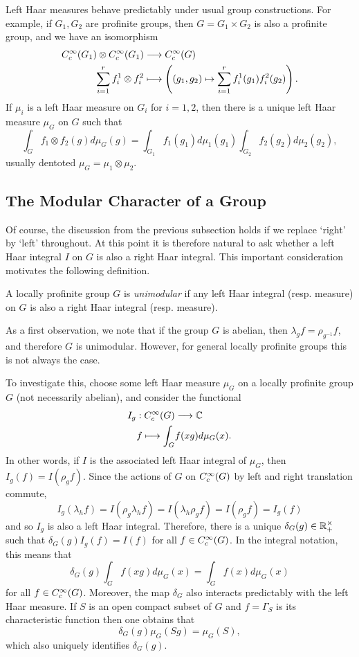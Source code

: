 Left Haar measures behave predictably under usual group constructions. For example, if $G_1,G_2$ are profinite groups, then $G=G_1\times G_2$ is also a profinite group, and we have an isomorphism 
\begin{align*}
    C_c^{\infty}(G_1)\otimes C_c^{\infty}(G_1)&\longrightarrow C_c^{\infty}(G)\\
    \sum_{i=1}^{r}f_i^1\otimes f_i^2 &\longmapsto \left((g_1,g_2)\mapsto \sum_{i=1}^{r}f_i^1(g_1)f_i^2(g_2)\right).
\end{align*}
If $\mu_i$ is a left Haar measure on $G_i$ for $i=1,2$, then there is a unique left Haar measure $\mu_G$ on $G$ such that 
$$\int_G f_1\otimes f_2(g)d\mu_G(g)=\int_{G_1}f_1(g_1)d\mu_1(g_1)\int_{G_2}f_2(g_2)d\mu_2(g_2),$$
usually dentoted $\mu_G=\mu_1\otimes\mu_2$.

\subsection{The Modular Character of a Group}

Of course, the discussion from the previous subsection holds if we replace `right' by `left' throughout. At this point it is therefore natural to ask whether a left Haar integral $I$ on $G$ is also a right Haar integral. This important consideration motivates the following definition.

\begin{defn}
    A locally profinite group $G$ is \textit{unimodular} if any left Haar integral (resp. measure) on $G$ is also a right Haar integral (resp. measure). 
\end{defn}

As a first observation, we note that if the group $G$ is abelian, then $\lambda_g f=\rho_{g^{-1}} f$, and therefore $G$ is unimodular. However, for general locally profinite groups this is not always the case. 

To investigate this, choose some left Haar measure $\mu_G$ on a locally profinite group $G$ (not necessarily abelian), and consider the functional
\begin{align*}
    I_g:C_c^{\infty}(G)&\longrightarrow\mathbb{C}\\
    f\longmapsto\int_G& f(xg)d\mu_G(x).
\end{align*}
In other words, if $I$ is the associated left Haar integral of $\mu_G$, then $I_g(f)=I(\rho_g f)$. Since the actions of $G$ on $C_c^{\infty}(G)$ by left and right translation commute, $$I_g(\lambda_h f)=I(\rho_g\lambda_h f)=I(\lambda_h\rho_g f)=I(\rho_g f)=I_g(f)$$
and so $I_g$ is also a left Haar integral. Therefore, there is a unique $\delta_G(g)\in \mathbb{R}_+^{\times}$ such that $\delta_G(g)I_g(f)=I(f)$ for all $f\in C_c^{\infty}(G)$. In the integral notation, this means that 
$$\delta_G(g)\int_G f(xg)d\mu_G(x)=\int_G f(x)d\mu_G(x)$$
for all $f\in C_c^{\infty}(G)$. Moreover, the map $\delta_G$ also interacts predictably with the left Haar measure. If $S$ is an open compact subset of $G$ and $f=\Gamma_S$ is its characteristic function then one obtains that 
$$\delta_G(g)\mu_G(Sg)=\mu_G(S),$$
which also uniquely identifies $\delta_G(g)$.


